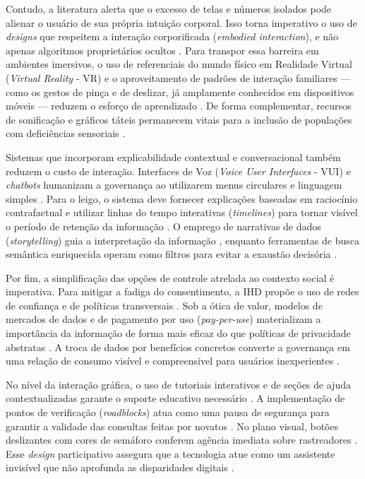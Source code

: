 \documentclass[
	12pt,				%
	oneside,			%
	a4paper,			%
	english,			%
	brazil				%
	]{abntex2ppgsi}
\begin{document}
    Contudo, a literatura alerta que o excesso de telas e números isolados pode alienar o usuário de sua própria intuição corporal. Isso torna imperativo o uso de \textit{designs} que respeitem a interação corporificada (\textit{embodied interaction}), e não apenas algoritmos proprietários ocultos \cite{Parviainen2016}. Para transpor essa barreira em ambientes imersivos, o uso de referenciais do mundo físico em Realidade Virtual (\textit{Virtual Reality} - VR) e o aproveitamento de padrões de interação familiares — como os gestos de pinça e de deslizar, já amplamente conhecidos em dispositivos móveis — reduzem o esforço de aprendizado \cite{Kurze2023, Xie2021365, Roberts2017343}. De forma complementar, recursos de sonificação e gráficos táteis permanecem vitais para a inclusão de populações com deficiências sensoriais \cite{Lenzi2024, Lenzi, Roberts2023}.

    Sistemas que incorporam explicabilidade contextual e conversacional também reduzem o custo de interação. Interfaces de Voz (\textit{Voice User Interfaces} - VUI) e \textit{chatbots} humanizam a governança ao utilizarem menus circulares e linguagem simples \cite{Sailaja2024334, Jordan2023, Sailaja2021, Jones2017}. Para o leigo, o sistema deve fornecer explicações baseadas em raciocínio contrafactual e utilizar linhas do tempo interativas (\textit{timelines}) para tornar visível o período de retenção da informação \cite{DOWTHWAITE2024, DeAlmeida2019, Coleti2019DesigPatterns}. O emprego de narrativas de dados (\textit{storytelling}) guia a interpretação da informação \cite{Capeleti2024Human}, enquanto ferramentas de busca semântica enriquecida operam como filtros para evitar a exaustão decisória \cite{Konomi2022, VICTORELLI2020Understanding}.

    Por fim, a simplificação das opções de controle atrelada ao contexto social é imperativa. Para mitigar a fadiga do consentimento, a IHD propõe o uso de redes de confiança e de políticas transversais \cite{Lockwood2020AnAccessible, Hutton2017}. Sob a ótica de valor, modelos de mercados de dados e de pagamento por uso (\textit{pay-per-use}) materializam a importância da informação de forma mais eficaz do que políticas de privacidade abstratas \cite{Briggs2021, Chowdhury2016, Mashhadi2014}. A troca de dados por benefícios concretos converte a governança em uma relação de consumo visível e compreensível para usuários inexperientes \cite{Mashhadi2014}.

    No nível da interação gráfica, o uso de tutoriais interativos e de seções de ajuda contextualizadas garante o suporte educativo necessário \cite{Capeleti2024Human}. A implementação de pontos de verificação (\textit{roadblocks}) atua como uma pausa de segurança para garantir a validade das consultas feitas por novatos \cite{Briggs2021, Chowdhury2016}. No plano visual, botões deslizantes com cores de semáforo conferem agência imediata sobre rastreadores \cite{Barreto2018}. Esse \textit{design} participativo assegura que a tecnologia atue como um assistente invisível que não aprofunda as disparidades digitais \cite{Calvetti2021173, Hayes2021, Refat2023}.
\end{document}
